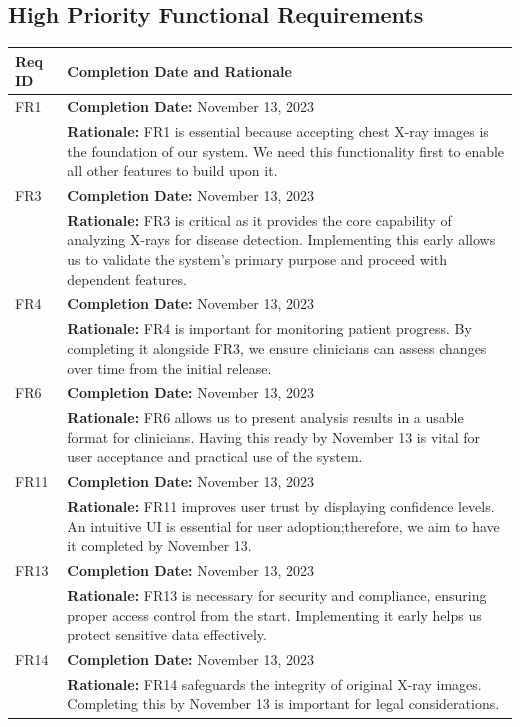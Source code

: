 \documentclass[12pt]{article}
\begin{document}
\subsection{High Priority Functional Requirements}
\begin{table}[H]
  \label{TblHighPriorityFRs}
  \begin{tabular}{p{}|p{}}
  \toprule
  \textbf{Req ID} & \textbf{Completion Date and Rationale} \\
  \midrule
  FR1 & \textbf{Completion Date:} November 13, 2023\\
      & \textbf{Rationale:} FR1 is essential because accepting chest X-ray images is the foundation of our system. We need this functionality first to enable all other features to build upon it. \\
  \midrule
  FR3 & \textbf{Completion Date:} November 13, 2023\\
      & \textbf{Rationale:} FR3 is critical as it provides the core capability of analyzing X-rays for disease detection. Implementing this early allows us to validate the system's primary purpose and proceed with dependent features. \\
  \midrule
  FR4 & \textbf{Completion Date:} November 13, 2023\\
      & \textbf{Rationale:} FR4 is important for monitoring patient progress. By completing it alongside FR3, we ensure clinicians can assess changes over time from the initial release. \\
  \midrule
  FR6 & \textbf{Completion Date:} November 13, 2023\\
      & \textbf{Rationale:} FR6 allows us to present analysis results in a usable format for clinicians. Having this ready by November 13 is vital for user acceptance and practical use of the system. \\
  \midrule
  FR11 & \textbf{Completion Date:} November 13, 2023\\
       & \textbf{Rationale:} FR11 improves user trust by displaying confidence levels. An intuitive UI is essential for user adoption;therefore, we aim to have it completed by November 13. \\
  \midrule
  FR13 & \textbf{Completion Date:} November 13, 2023\\
       & \textbf{Rationale:} FR13 is necessary for security and compliance, ensuring proper access control from the start. Implementing it early helps us protect sensitive data effectively. \\
  \midrule
  FR14 & \textbf{Completion Date:} November 13, 2023\\
       & \textbf{Rationale:} FR14 safeguards the integrity of original X-ray images. Completing this by November 13 is important for legal considerations. \\
  \bottomrule
  \end{tabular}
  \end{table}
\end{document}
